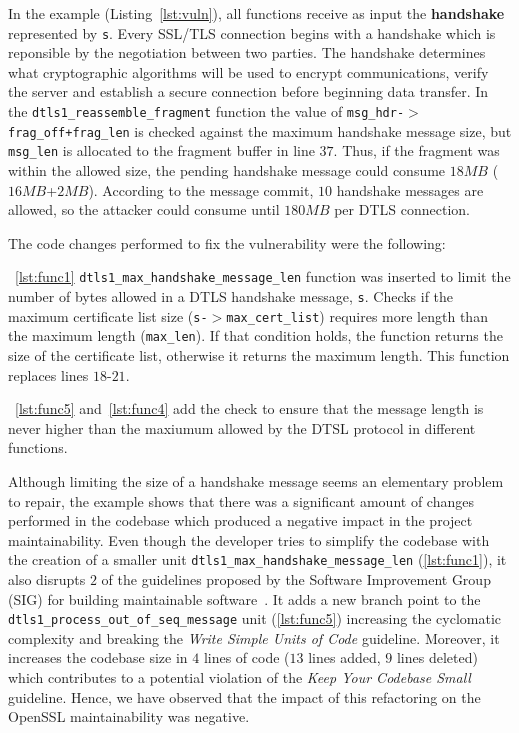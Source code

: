 \documentclass[10pt,conference]{IEEEtran}
\begin{document}
In the example (Listing~\ref{lst:vuln}), all functions receive as input the \textbf{handshake} represented by \texttt{s}. Every SSL/TLS connection begins with a handshake which is reponsible by the negotiation between two parties. The handshake determines what cryptographic algorithms will be used to encrypt communications, verify the server and establish a secure connection before beginning data transfer. In the \texttt{dtls1\_reassemble\_fragment} function the value of
\texttt{msg\_hdr-$>$frag\_off+frag\_len} is checked against the maximum
handshake message size, but \texttt{msg\_len} is allocated to the fragment
buffer in line $37$. Thus, if the fragment was within the allowed size, the
pending handshake message could consume $18MB$ ($16MB$+$2MB$). According to the
message commit, $10$ handshake messages are allowed, so the attacker could
consume until $180MB$ per DTLS connection.

The code changes performed to fix the vulnerability were the following:

~\ref{lst:func1} \texttt{dtls1\_max\_handshake\_message\_len} function was inserted to limit the number of bytes allowed in a DTLS handshake message,
\texttt{s}. Checks if the maximum certificate list size
(\texttt{s-$>$max\_cert\_list}) requires more length than the maximum length
(\texttt{max\_len}). If that condition holds, the function returns the size of
the certificate list, otherwise it returns the maximum length. This function replaces lines $18$-$21$.

~\ref{lst:func5} and~\ref{lst:func4} add the check to ensure that the message
length is never higher than the maxiumum allowed by the DTSL protocol in
different functions.

Although limiting the size of a handshake message seems an elementary problem to
repair, the example shows that there was a significant amount of changes
performed in the codebase which produced a negative impact in the project
maintainability. Even though the developer tries to simplify the codebase with
the creation of a smaller unit \texttt{dtls1\_max\_handshake\_message\_len} (\ref{lst:func1}), it
also disrupts $2$ of the guidelines proposed by the Software Improvement Group
(SIG) for building maintainable software~\cite{Visser:2016:OREILLY}. It adds a
new branch point to the \texttt{dtls1\_process\_out\_of\_seq\_message} unit
(\ref{lst:func5}) increasing the cyclomatic complexity and breaking the
\emph{Write Simple Units of Code} guideline. Moreover, it increases the codebase
size in $4$ lines of code ($13$ lines added, $9$ lines deleted) which contributes
to a potential violation of the
\emph{Keep Your Codebase Small} guideline. Hence, we have observed that the
impact of this refactoring on the OpenSSL maintainability was negative.
\end{document}
